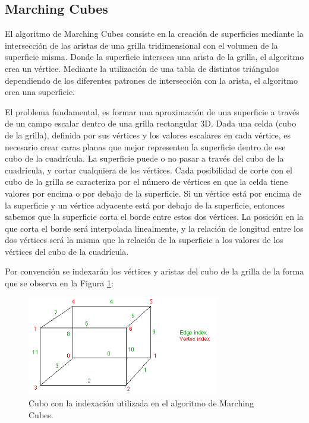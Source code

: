 \documentclass[12pt]{article}
\begin{document}
\subsection{Marching Cubes}
\noindent El algoritmo de Marching Cubes\cite{marching}\cite{marchingcubes} consiste en la creación de superficies mediante la intersección de las aristas de una grilla tridimensional con el volumen de la superficie misma. Donde la superficie interseca una arista de la grilla, el algoritmo crea un vértice. Mediante la utilización de una tabla de distintos triángulos dependiendo de los diferentes patrones de intersección con la arista, el algoritmo crea una superficie.

El problema fundamental, es formar una aproximación de una superficie a través de un campo escalar dentro de una grilla rectangular 3D. Dada una celda (cubo de la grilla), definida por sus vértices y los valores escalares en cada vértice, es necesario crear caras planas que mejor representen la superficie dentro de ese cubo de la cuadrícula. La superficie puede o no pasar a través del cubo de la cuadrícula, y cortar cualquiera de los vértices. Cada posibilidad de corte con el cubo de la grilla se caracteriza por el número de vértices en que la celda tiene valores por encima o por debajo de la superficie. Si un vértice está por encima de la superficie y un vértice adyacente está por debajo de la superficie, entonces sabemos que la superficie corta el borde entre estos dos vértices. La posición en la que corta el borde será interpolada linealmente, y la relación de longitud entre los dos vértices será la misma que la relación de la superficie a los valores de los vértices del cubo de la cuadrícula.

Por convención se indexarán los vértices y aristas del cubo de la grilla de la forma que se observa en la Figura \ref{mc1}:
\begin{figure}[h!]
\includegraphics[width=0.75\textwidth,center]{marchingcubes1.png}
\caption{Cubo con la indexación utilizada en el algoritmo de Marching Cubes.}
\label{mc1}
\end{figure}
\end{document}
